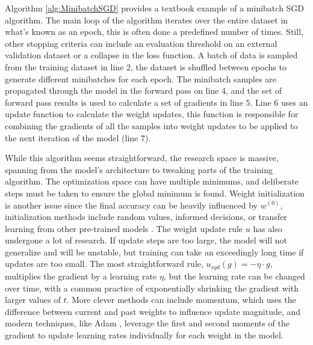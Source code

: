 Algorithm \ref{alg:MinibatchSGD} provides a textbook example of a minibatch SGD algorithm.
The main loop of the algorithm iterates over the entire dataset in what's known as an epoch, this is often done a predefined number of times. 
Still, other stopping criteria can include an evaluation threshold on an external validation dataset or a collapse in the loss function.
A batch of data is sampled from the training dataset in line 2, the dataset is shuffled between epochs to generate different minibatches for each epoch.
The minibatch samples are propagated through the model in the forward pass on line 4, and the set of forward pass results is used to calculate a set of gradients in line 5. 
Line 6 uses an update function to calculate the weight updates, this function is responsible for combining the gradients of all the samples into weight updates to be applied to the next iteration of the model (line 7).

While this algorithm seems straightforward, the research space is massive, spanning from the model's architecture to tweaking parts of the training algorithm.
The optimization space can have multiple minimums, and deliberate steps must be taken to ensure the global minimum is found. 
Weight initialization is another issue since the final accuracy can be heavily influenced by $w^{(0)}$, initialization methods include random values, informed decisions, or transfer learning from other pre-trained models \cite{Glorot2010XavierInitalization}.
The weight update rule $u$ has also undergone a lot of research.
If update steps are too large, the model will not generalize and will be unstable, but training can take an exceedingly long time if updates are too small.
The most straightforward rule, $u_{sgd}(g)=-\eta \cdot g$, multiplies the gradient by a learning rate $\eta$, but the learning rate can be changed over time, with a common practice of exponentially shrinking the gradient with larger values of $t$.
More clever methods can include momentum, which uses the difference between current and past weights to influence update magnitude, and modern techniques, like Adam \cite{Kingma2015Adam}, leverage the first and second moments of the gradient to update learning rates individually for each weight in the model.

